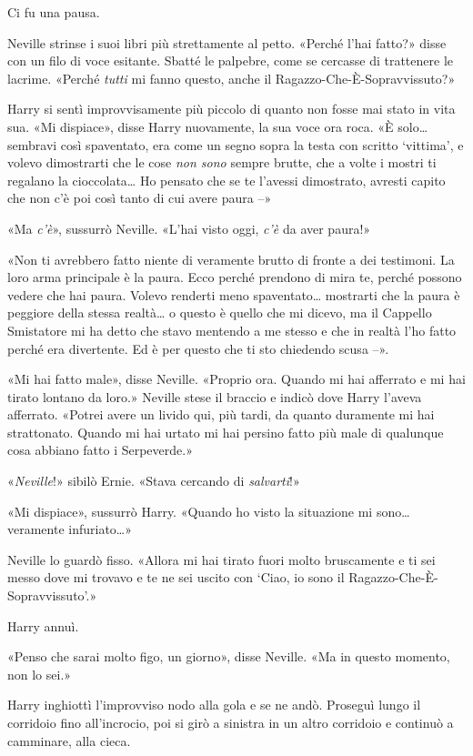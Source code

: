 Ci fu una pausa.

Neville strinse i suoi libri più strettamente al petto. «Perché l’hai fatto?» disse con un filo di voce esitante. Sbatté le palpebre, come se cercasse di trattenere le lacrime. «Perché \textit{tutti} mi fanno questo, anche il Ragazzo-Che-È-Sopravvissuto?»

Harry si sentì improvvisamente più piccolo di quanto non fosse mai stato in vita sua. «Mi dispiace», disse Harry nuovamente, la sua voce ora roca. «È solo… sembravi così spaventato, era come un segno sopra la testa con scritto ‘vittima’, e volevo dimostrarti che le cose \textit{non sono} sempre brutte, che a volte i mostri ti regalano la cioccolata… Ho pensato che se te l’avessi dimostrato, avresti capito che non c’è poi così tanto di cui avere paura –»

«Ma \textit{c’è}», sussurrò Neville. «L’hai visto oggi, \textit{c’è} da aver paura!»

«Non ti avrebbero fatto niente di veramente brutto di fronte a dei testimoni. La loro arma principale è la paura. Ecco perché prendono di mira te, perché possono vedere che hai paura. Volevo renderti meno spaventato… mostrarti che la paura è peggiore della stessa realtà… o questo è quello che mi dicevo, ma il Cappello Smistatore mi ha detto che stavo mentendo a me stesso e che in realtà l’ho fatto perché era divertente. Ed è per questo che ti sto chiedendo scusa –».

«Mi hai fatto male», disse Neville. «Proprio ora. Quando mi hai afferrato e mi hai tirato lontano da loro.» Neville stese il braccio e indicò dove Harry l’aveva afferrato. «Potrei avere un livido qui, più tardi, da quanto duramente mi hai strattonato. Quando mi hai urtato mi hai persino fatto più male di qualunque cosa abbiano fatto i Serpeverde.»

«\textit{Neville}!» sibilò Ernie. «Stava cercando di \textit{salvarti}!»

«Mi dispiace», sussurrò Harry. «Quando ho visto la situazione mi sono… veramente infuriato…»

Neville lo guardò fisso. «Allora mi hai tirato fuori molto bruscamente e ti sei messo dove mi trovavo e te ne sei uscito con ‘Ciao, io sono il Ragazzo-Che-È-Sopravvissuto’.»

Harry annuì.

«Penso che sarai molto figo, un giorno», disse Neville. «Ma in questo momento, non lo sei.»

Harry inghiottì l’improvviso nodo alla gola e se ne andò. Proseguì lungo il corridoio fino all’incrocio, poi si girò a sinistra in un altro corridoio e continuò a camminare, alla cieca.

